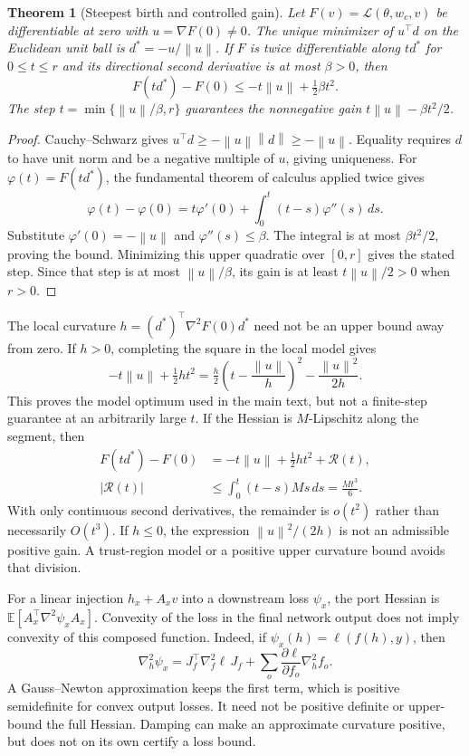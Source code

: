 \documentclass[10pt]{article}
\theoremstyle{paper}
\newtheorem{theorem}{Theorem}[section]
\newcommand{\E}{\mathbb E}
\newcommand{\Lcal}{\mathcal L}
\newcommand{\norm}[1]{\left\lVert #1\right\rVert}
\begin{document}
\begin{theorem}[Steepest birth and controlled gain]
\label{thm:growth}
Let $F(v)=\Lcal(\theta,w_c,v)$ be differentiable at zero with $u=\nabla F(0)\ne0$. The unique minimizer of $u^\top d$ on the Euclidean unit ball is $d^*=-u/\norm u$. If $F$ is twice differentiable along $td^*$ for $0\le t\le r$ and its directional second derivative is at most $\beta>0$, then
\begin{equation}
F(td^*)-F(0)\le-t\norm u+\tfrac12\beta t^2.
\label{eq:boundedgrowth}
\end{equation}
The step $t=\min\{\norm u/\beta,r\}$ guarantees the nonnegative gain $t\norm u-\beta t^2/2$.
\end{theorem}
\begin{proof}
Cauchy--Schwarz gives $u^\top d\ge-\norm u\norm d\ge-\norm u$. Equality requires $d$ to have unit norm and be a negative multiple of $u$, giving uniqueness. For $\varphi(t)=F(td^*)$, the fundamental theorem of calculus applied twice gives
\[
\varphi(t)-\varphi(0)=t\varphi'(0)+\int_0^t(t-s)\varphi''(s)\,ds.
\]
Substitute $\varphi'(0)=-\norm u$ and $\varphi''(s)\le\beta$. The integral is at most $\beta t^2/2$, proving the bound. Minimizing this upper quadratic over $[0,r]$ gives the stated step. Since that step is at most $\norm u/\beta$, its gain is at least $t\norm u/2>0$ when $r>0$.
\end{proof}

The local curvature $h=(d^*)^\top\nabla^2F(0)d^*$ need not be an upper bound away from zero. If $h>0$, completing the square in the local model gives
\begin{equation}
-t\norm u+\tfrac12ht^2
=\tfrac h2\left(t-\frac{\norm u}{h}\right)^2-\frac{\norm u^2}{2h}.
\label{eq:complete}
\end{equation}
This proves the model optimum used in the main text, but not a finite-step guarantee at an arbitrarily large $t$. If the Hessian is $M$-Lipschitz along the segment, then
\begin{align}
F(td^*)-F(0)&=-t\norm u+\tfrac12ht^2+\mathcal R(t),\\
|\mathcal R(t)|&\le\int_0^t(t-s)Ms\,ds=\frac{Mt^3}{6}.
\label{eq:cubic}
\end{align}
With only continuous second derivatives, the remainder is $o(t^2)$ rather than necessarily $O(t^3)$. If $h\le0$, the expression $\norm u^2/(2h)$ is not an admissible positive gain. A trust-region model or a positive upper curvature bound avoids that division.

For a linear injection $h_x+A_xv$ into a downstream loss $\psi_x$, the port Hessian is $\E[A_x^\top\nabla^2\psi_x A_x]$. Convexity of the loss in the final network output does not imply convexity of this composed function. Indeed, if $\psi_x(h)=\ell(f(h),y)$, then
\[
\nabla_h^2\psi_x
=J_f^\top\nabla_f^2\ell\,J_f+
\sum_o\frac{\partial\ell}{\partial f_o}\nabla_h^2 f_o.
\]
A Gauss--Newton approximation keeps the first term, which is positive semidefinite for convex output losses. It need not be positive definite or upper-bound the full Hessian. Damping can make an approximate curvature positive, but does not on its own certify a loss bound.
\end{document}
